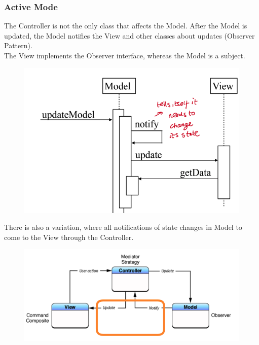 \documentclass{article}
\begin{document}
\subsubsection*{Active Mode}
The Controller is not the only class that affects the Model. After the Model is updated, the Model notifies the View and other classes about updates (Observer Pattern). \\ The View implements the Observer interface, whereas the Model is a subject.
\begin{figure}[H]
    \centering
    \includegraphics[width=0.6\linewidth]{Pictures/Screenshot 2023-02-05 at 12.57.24.png}
\end{figure}
There is also a variation, where all notifications of state changes in Model to come to the View through the Controller.
\begin{figure}[H]
    \centering
    \includegraphics[width=0.6\linewidth]{Pictures/Screenshot 2023-02-05 at 12.58.26.png}
\end{figure}
\end{document}
